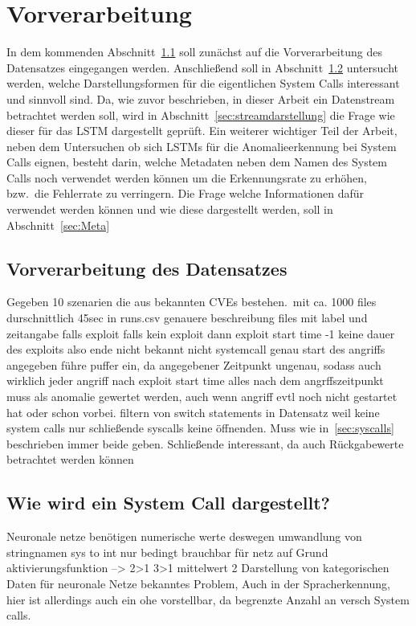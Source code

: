     \section{Vorverarbeitung}\label{sec:Preprocessing}
        In dem kommenden Abschnitt~\ref{sec:struktur} soll zunächst auf die Vorverarbeitung des Datensatzes eingegangen werden.
        Anschließend soll in Abschnitt~\ref{sec:syscalldarstellung} untersucht werden, welche Darstellungsformen für die eigentlichen System Calls interessant und sinnvoll sind.
        Da, wie zuvor beschrieben, in dieser Arbeit ein Datenstream betrachtet werden soll, wird in Abschnitt~\ref{sec:streamdarstellung} die Frage wie dieser für das LSTM dargestellt geprüft.
        Ein weiterer wichtiger Teil der Arbeit, neben dem Untersuchen ob sich LSTMs für die Anomalieerkennung bei System Calls eignen, besteht darin,
        welche Metadaten neben dem Namen des System Calls noch verwendet werden können um die Erkennungsrate zu erhöhen, bzw.\ die Fehlerrate zu verringern.
        Die Frage welche Informationen dafür verwendet werden können und wie diese dargestellt werden, soll in Abschnitt~\ref{sec:Meta}

        \subsection{Vorverarbeitung des Datensatzes}\label{sec:struktur}
            Gegeben 10 szenarien die aus bekannten CVEs bestehen.\
            mit ca. 1000 files durschnittlich 45sec
            in runs.csv genauere beschreibung files mit label und zeitangabe falls exploit
            falls kein exploit dann exploit start time -1
            keine dauer des exploits also ende nicht bekannt 
            nicht systemcall genau start des angriffs angegeben 
            führe puffer ein, da angegebener Zeitpunkt ungenau, sodass auch wirklich jeder angriff nach exploit start time
            alles nach dem angrffszeitpunkt muss als anomalie gewertet werden, auch wenn angriff evtl noch nicht gestartet hat oder schon vorbei.
            filtern von switch statements in Datensatz weil keine system calls
            nur schließende syscalls keine öffnenden.
            Muss wie in~\ref{sec:syscalls} beschrieben immer beide geben.
            Schließende interessant, da auch Rückgabewerte betrachtet werden können

        \subsection{Wie wird ein System Call dargestellt?}\label{sec:syscalldarstellung}
            Neuronale netze benötigen numerische werte deswegen umwandlung von stringnamen 
            sys to int nur bedingt brauchbar für netz auf Grund aktivierungsfunktion --> 2>1 3>1 mittelwert 2
            Darstellung von kategorischen Daten für neuronale Netze bekanntes Problem,
            Auch in der Spracherkennung, hier ist allerdings auch ein ohe vorstellbar, da begrenzte Anzahl an versch
            System calls.
